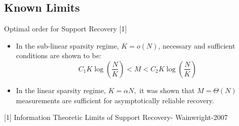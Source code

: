 \documentclass[10pt]{beamer}
\begin{document}
\subsection{Known Limits}
\begin{frame}
\begin{block}{Optimal order for Support Recovery [1]}
\begin{itemize}
\item In the sub-linear sparsity regime, $K=o(N)$, necessary and sufficient conditions are shown to be:
\begin{equation*}
C_1 K\log\left(\frac{N}{K}\right)<M<C_2 K\log\left(\frac{N}{K}\right)
\end{equation*}
\item In the linear sparsity regime, $K=\alpha N,$ it was shown that $M=\Theta(N)$ measurements are sufficient for asymptotically reliable recovery. 
 \end{itemize}
\end{block}
\vspace{7ex}


[1] Information Theoretic Limits of Support Recovery- Wainwright-2007
\end{frame}
\end{document}
